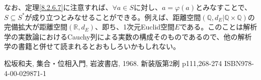 \documentclass[dvipdfmx]{jsarticle}
\begin{document}
なお、定理\ref{8.2.6.7}に注意すれば、$\forall a \in S$に対し、$a = \varphi(a)$とみなすことで、$S \subseteq S^{*}$が成り立つとみなせることができる。例えば、距離空間$\left( \mathbb{Q},d_{E}|\mathbb{Q} \times \mathbb{Q} \right)$の完備拡大が距離空間$\left( \mathbb{R},d_{E} \right)$、即ち、1次元Euclid空間$E$である。このことは解析学の実数論におけるCauchy列による実数の構成そのものであるので、他の解析学の書籍と併せて読まれるとおもしろいかもしれない。
\begin{thebibliography}{50}
  松坂和夫, 集合・位相入門, 岩波書店, 1968. 新装版第2刷 p111,268-274 ISBN978-4-00-029871-1
\end{thebibliography}
\end{document}
